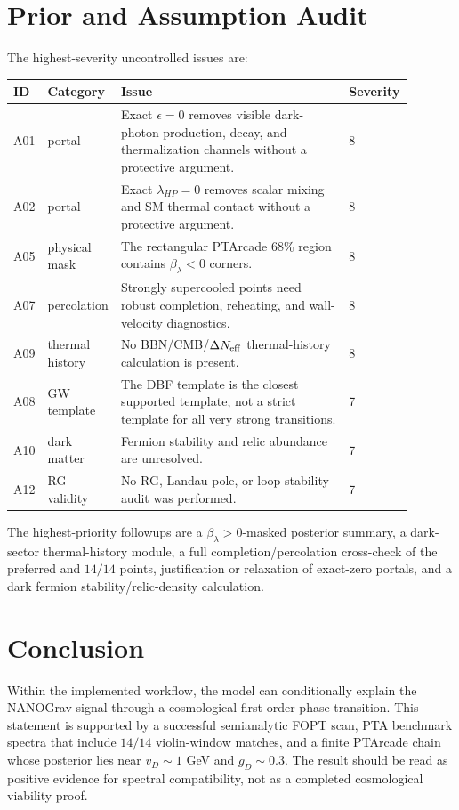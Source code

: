 \documentclass[11pt]{article}
\begin{document}
\section{Prior and Assumption Audit}
The highest-severity uncontrolled issues are:
\begin{center}
\begin{tabular}{p{0.08\linewidth}p{0.13\linewidth}p{0.58\linewidth}p{0.10\linewidth}}
\toprule
ID & Category & Issue & Severity \\
\midrule
A01 & portal & Exact \(\epsilon=0\) removes visible dark-photon production, decay, and thermalization channels without a protective argument. & 8 \\
A02 & portal & Exact \(\lambda_{HP}=0\) removes scalar mixing and SM thermal contact without a protective argument. & 8 \\
A05 & physical mask & The rectangular PTArcade 68\% region contains \(\beta_\lambda<0\) corners. & 8 \\
A07 & percolation & Strongly supercooled points need robust completion, reheating, and wall-velocity diagnostics. & 8 \\
A09 & thermal history & No BBN/CMB/\(\Delta N_{\rm eff}\) thermal-history calculation is present. & 8 \\
A08 & GW template & The DBF template is the closest supported template, not a strict template for all very strong transitions. & 7 \\
A10 & dark matter & Fermion stability and relic abundance are unresolved. & 7 \\
A12 & RG validity & No RG, Landau-pole, or loop-stability audit was performed. & 7 \\
\bottomrule
\end{tabular}
\end{center}
The highest-priority followups are a \(\beta_\lambda>0\)-masked posterior summary, a dark-sector thermal-history module, a full completion/percolation cross-check of the preferred and \(14/14\) points, justification or relaxation of exact-zero portals, and a dark fermion stability/relic-density calculation.

\section{Conclusion}
Within the implemented workflow, the model can conditionally explain the NANOGrav signal through a cosmological first-order phase transition.  This statement is supported by a successful semianalytic FOPT scan, PTA benchmark spectra that include \(14/14\) violin-window matches, and a finite PTArcade chain whose posterior lies near \(v_D\sim1\) GeV and \(g_D\sim0.3\).  The result should be read as positive evidence for spectral compatibility, not as a completed cosmological viability proof.
\end{document}

